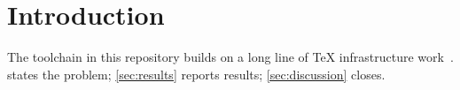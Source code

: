 \section{Introduction}
\label{sec:introduction}

The toolchain in this repository builds on a long line of TeX
infrastructure work~\autocite{example2024}.  states the
problem; \cref{sec:results} reports results; \cref{sec:discussion} closes.
